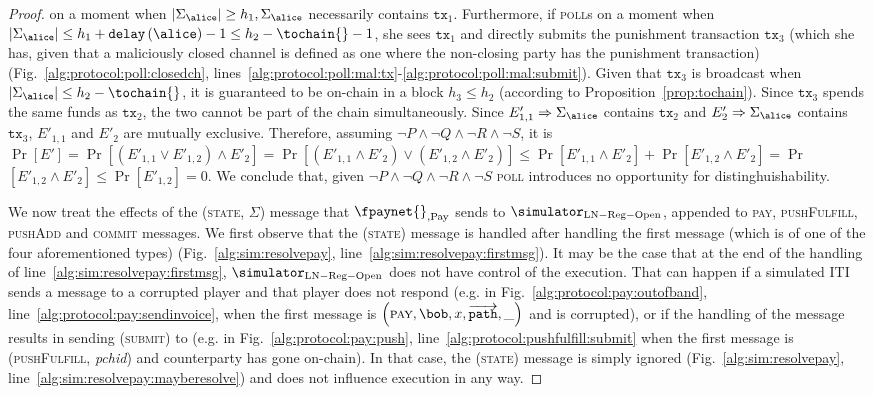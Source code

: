 \begin{proof}
  on a moment when $|\Sigma_{\alice}| \geq h_1, \Sigma_{\alice}$ necessarily
  contains $\mathtt{tx}_1$. Furthermore, if \alice{} \textsc{poll}s on a moment
  when $|\Sigma_{\alice}| \leq h_1 + \mathtt{delay}\left(\alice\right) - 1 \leq
  h_2 - \tochain{} - 1$, she sees $\mathtt{tx}_1$ and directly submits the
  punishment transaction $\mathtt{tx}_3$ (which she has, given that a
  maliciously closed channel is defined as one where the non-closing party has
  the punishment transaction) (Fig.~\ref{alg:protocol:poll:closedch},
  lines~\ref{alg:protocol:poll:mal:tx}-\ref{alg:protocol:poll:mal:submit}).
  Given that $\mathtt{tx}_3$ is broadcast when $|\Sigma_{\alice}| \leq h_2 -
  \tochain{}$, it is guaranteed to be on-chain in a block $h_3 \leq h_2$
  (according to Proposition~\ref{prop:tochain}). Since $\mathtt{tx}_3$ spends
  the same funds as $\mathtt{tx}_2$, the two cannot be part of the chain
  simultaneously. Since $E'_{1,1} \Rightarrow \Sigma_{\alice}$ contains
  $\mathtt{tx}_2$ and $E'_2 \Rightarrow \Sigma_{\alice}$ contains
  $\mathtt{tx}_3$, $E'_{1,1}$ and $E'_2$ are mutually exclusive. Therefore,
  assuming $\neg P \wedge \neg Q \wedge \neg R \wedge \neg S$, it is
  $\Pr\left[E'\right] = \Pr\left[\left(E'_{1,1} \vee E'_{1,2}\right) \wedge
  E'_2\right] = \Pr\left[\left(E'_{1,1} \wedge E'_2\right) \vee \left(E'_{1,2}
  \wedge E'_2\right)\right] \leq \Pr\left[E'_{1,1} \wedge E'_2\right] +
  \Pr\left[E'_{1,2} \wedge E'_2\right] = \Pr$ $\left[ E'_{1,2} \wedge
  E'_2\right] \leq \Pr\left[E'_{1,2}\right] = 0$. We conclude that, given $\neg
  P \wedge \neg Q \wedge \neg R \wedge \neg S$ \textsc{poll} introduces no
  opportunity for distinghuishability.

  We now treat the effects of the (\textsc{state}, $\Sigma$) message that
  $\fpaynet{}_{\mathrm{, Pay}}$ sends to $\simulator_{\mathrm{LN - Reg -
  Open}}$, appended to \textsc{pay}, \textsc{pushFulfill}, \textsc{pushAdd} and
  \textsc{commit} messages. We first observe that the (\textsc{state}) message
  is handled after handling the first message (which is of one of the four
  aforementioned types) (Fig.~\ref{alg:sim:resolvepay},
  line~\ref{alg:sim:resolvepay:firstmsg}). It may be the case that at the end of
  the handling of line~\ref{alg:sim:resolvepay:firstmsg},
  $\simulator_{\mathrm{LN - Reg - Open}}$ does not have control of the
  execution. That can happen if a simulated ITI sends a message to a corrupted
  player and that player does not respond (e.g. in
  Fig.~\ref{alg:protocol:pay:outofband},
  line~\ref{alg:protocol:pay:sendinvoice}, when the first message is
  $\left(\textsc{pay}, \bob, x, \overrightarrow{\mathtt{path}},
  \_\right)$ and \bob{} is corrupted), or if the handling of the
  message results in sending (\textsc{submit}) to \ledger{} (e.g. in
  Fig.~\ref{alg:protocol:pay:push}, line~\ref{alg:protocol:pushfulfill:submit}
  when the first message is (\textsc{pushFulfill}, \textit{pchid}) and
  counterparty has gone on-chain). In that case, the (\textsc{state}) message is
  simply ignored (Fig.~\ref{alg:sim:resolvepay},
  line~\ref{alg:sim:resolvepay:mayberesolve}) and does not influence execution
  in any way.


\end{proof}
